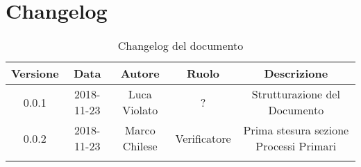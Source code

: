 \section{Changelog}

\begin{center}
\begin{longtable}{|c|c|c|c|c|}
\hline
\textbf{Versione} & \textbf{Data} & \textbf{Autore} & \textbf{Ruolo} & \textbf{Descrizione} \\
\hline \hline
\endfirsthead
0.0.1 & 2018-11-23 & Luca Violato & ? & Strutturazione del Documento \\
0.0.2 & 2018-11-23 & Marco Chilese & Verificatore & Prima stesura sezione Processi Primari\\
\hline
\caption{Changelog del documento}
\end{longtable}
\end{center}